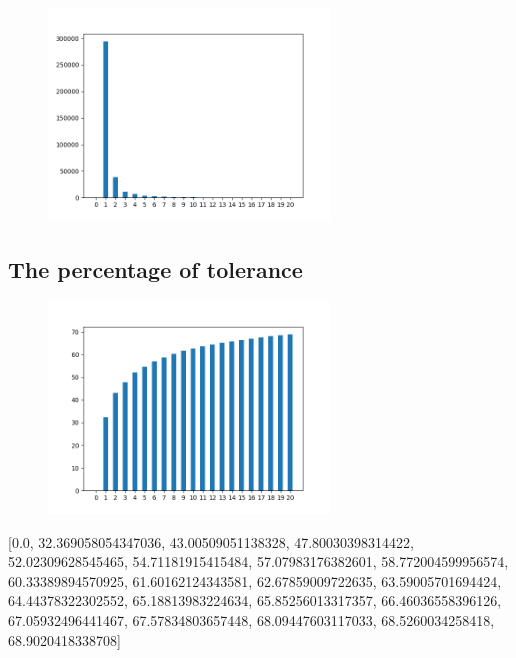 \documentclass[10pt, conference, compsocconf]{IEEEtran}
\begin{document}
\begin{figure}[H]\centering\includegraphics[width=75mm,scale=0.5]{BasedonCookienumberofusersfingerprint}\end{figure}\subsection{The percentage of tolerance}
\begin{figure}[H]\centering\includegraphics[width=75mm,scale=0.5]{BasedonCookietolerance}\end{figure}[0.0, 32.369058054347036, 43.00509051138328, 47.80030398314422, 52.02309628545465, 54.71181915415484, 57.07983176382601, 58.772004599956574, 60.33389894570925, 61.60162124343581, 62.67859009722635, 63.59005701694424, 64.44378322302552, 65.18813983224634, 65.85256013317357, 66.46036558396126, 67.05932496441467, 67.57834803657448, 68.09447603117033, 68.5260034258418, 68.9020418338708]
\end{document}
